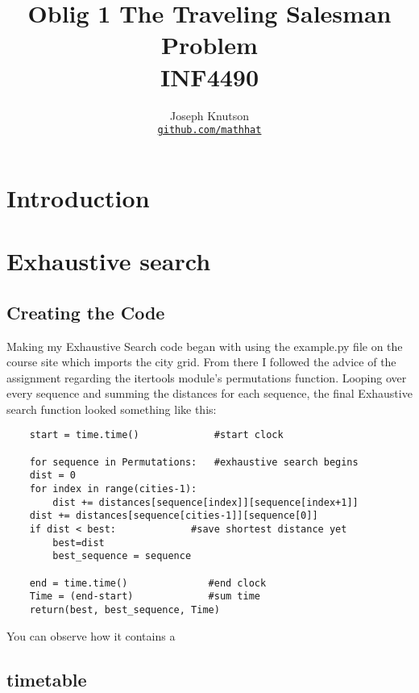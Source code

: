 \documentclass[10pt, a4paper]{article}
\title{Oblig 1 The Traveling Salesman Problem \\
  \hrulefill\small{ INF4490 }\hrulefill}
\author{Joseph Knutson \\
\href{https://github.com/mathhat/}{\texttt{github.com/mathhat}}}
\begin{document}
\maketitle
\tableofcontents
\clearpage
\section{Introduction}
\section{Exhaustive search}
\subsection{Creating the Code}
Making my Exhaustive Search code began with using the example.py file on the course site which imports the city grid.
From there I followed the advice of the assignment regarding the itertools module's permutations function. Looping over every sequence and summing the distances for each sequence, the final Exhaustive search function looked something like this:
\begin{lstlisting}
    start = time.time()             #start clock

    for sequence in Permutations:   #exhaustive search begins
	dist = 0
	for index in range(cities-1):
	    dist += distances[sequence[index]][sequence[index+1]]
	dist += distances[sequence[cities-1]][sequence[0]]
	if dist < best:             #save shortest distance yet
	    best=dist
	    best_sequence = sequence

    end = time.time()              #end clock
    Time = (end-start)             #sum time
    return(best, best_sequence, Time)
\end{lstlisting}
You can observe how it contains a 


\subsection{timetable}
\end{document}
